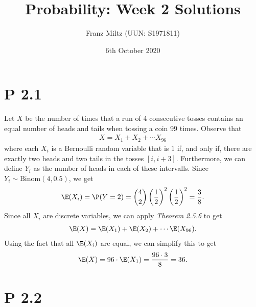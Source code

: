 \documentclass{article}
\begin{document}
\title{Probability: Week 2 Solutions}
\author{Franz Miltz (UUN: S1971811)}
\date{6th October 2020}
\maketitle


\section*{P 2.1}


Let $X$ be the number of times that a run of 4 consecutive tosses
contains an equal number of heads and tails when tossing a coin 99 times.
Observe that
\begin{align*}
  X=X_1 + X_2 + \cdots X_{96}
\end{align*}
where each $X_i$ is a Bernoulli random variable that is $1$ if,
and only if, there are exactly two heads and two tails in the tosses
$[i, i+3]$. Furthermore, we can define $Y_i$ as the number of heads
in each of these intervalls. Since $Y_i\sim \text{Binom}(4,0.5)$,
we get
\begin{align*}
  \E(X_i) = \P(Y=2) = \binom{4}{2}\left(\frac{1}{2}\right)^2\left(\frac{1}{2}\right)^2=\frac{3}{8}.
\end{align*}
Since all $X_i$ are discrete variables, we can apply \emph{Theorem 2.5.6}
to get
\begin{align*}
  \E(X) = \E(X_1) + \E(X_2) + \cdots \E(X_{96}).
\end{align*}
Using the fact that all $\E(X_i)$ are equal, we can simplify this to get
\begin{align*}
  \E(X) = 96\cdot\E(X_1) = \frac{96\cdot3}{8}=36.
\end{align*}


\section*{P 2.2}
\end{document}
